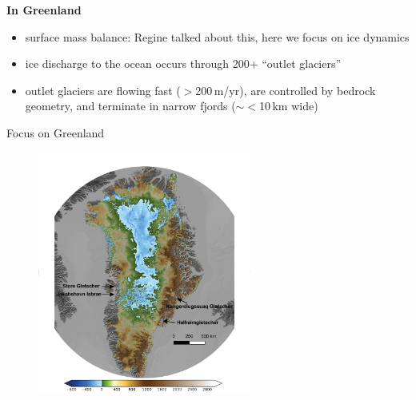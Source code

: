 \documentclass[hide notes,intlimits]{beamer}
\begin{document}
\begin{frame}[plain]
  \textbf{In Greenland}
    \begin{itemize}
    \item surface mass balance: Regine talked about this, here we focus on ice dynamics
    \item ice discharge to the ocean occurs through 200+ ``outlet glaciers''
    \item outlet glaciers are flowing fast ($>$200\,m/yr), are controlled by bedrock geometry, and terminate in narrow fjords ($\sim <$10\,km wide)
    \end{itemize}
\end{frame}
 
{
%
} 

\begin{frame}{Focus on Greenland}
      \begin{figure}
        \includegraphics[height=8cm]{gris-marine-4outlet}
      \end{figure}
\end{frame}


  {
}
\end{document}
